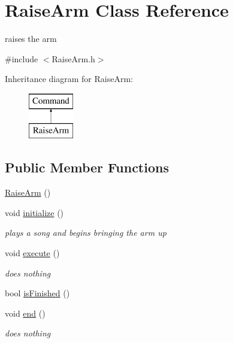 \hypertarget{classRaiseArm}{\section{Raise\-Arm Class Reference}
\label{classRaiseArm}
}


raises the arm  




{\ttfamily \#include $<$Raise\-Arm.\-h$>$}

Inheritance diagram for Raise\-Arm\-:\begin{figure}[H]
\begin{center}
\leavevmode
\includegraphics[height=2.000000cm]{classRaiseArm}
\end{center}
\end{figure}
\subsection*{Public Member Functions}
\begin{DoxyCompactItemize}
\item 
\hyperlink{classRaiseArm_a91b62d0ce0bae3391a2fdb617b603f8b}{Raise\-Arm} ()
\item 
void \hyperlink{classRaiseArm_a643abff446802bf06eb0141d3cad5ef4}{initialize} ()
\begin{DoxyCompactList}\small\item\em plays a song and begins bringing the arm up \end{DoxyCompactList}\item 
void \hyperlink{classRaiseArm_a4e73ea27587532325bfea84e2fe72f62}{execute} ()
\begin{DoxyCompactList}\small\item\em does nothing \end{DoxyCompactList}\item 
bool \hyperlink{classRaiseArm_a3f2f2806c7b255589864feae9322bbd1}{is\-Finished} ()
\item 
void \hyperlink{classRaiseArm_a61c556ef1ca7e8c92970cec3baef933e}{end} ()
\begin{DoxyCompactList}\small\item\em does nothing \end{DoxyCompactList}\end{DoxyCompactItemize}
